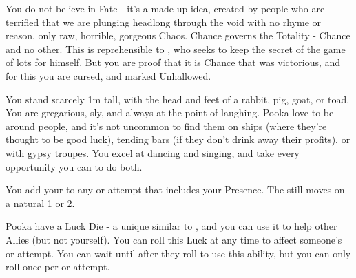 {  You do not believe in Fate - it's a made up idea, created by people who are terrified that we are plunging headlong through the void with no rhyme or reason, only raw, horrible, gorgeous Chaos.  Chance governs the Totality - Chance and no other. This is reprehensible to \TheAuthority, who seeks to keep the secret of the game of lots for himself.  But you are proof that it is Chance that was victorious, and for this you are cursed, and marked Unhallowed.

  You stand scarcely 1m tall, with the head and feet of a rabbit, pig, goat, or toad.  You are gregarious, sly, and always at the point of laughing.  Pooka love to be around people, and it's not uncommon to find them on ships (where they're thought to be good luck), tending bars (if they don't drink away their profits), or with gypsy troupes.  You excel at dancing and singing, and take every opportunity you can to do both.

  \cbreak





  You add your \LVL to any \RO or \RB attempt that includes your Presence.  The \UD still moves \DCDOWN on a natural 1 or 2.


  Pooka have a Luck Die - a unique \UD similar to , and you can use it to help other Allies (but not yourself).  You can roll this Luck \UD at any time to affect someone's \RO or \RB attempt. You can wait until after they roll to use this ability, but you can only roll once per \RO or \RB attempt.



}
